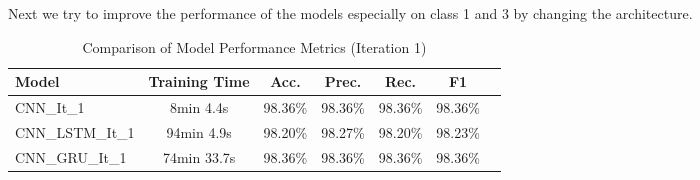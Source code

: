 Next we try to improve the performance of the models especially on class 1 and 3 by changing the architecture.

\begin{table}[bt]
    \centering
    \caption{Comparison of Model Performance Metrics (Iteration 1)}
    \label{tab:model_performance}
    \begin{tabular}{lcccccc}
        \toprule
        \textbf{Model} & \textbf{Training Time} & \textbf{Acc.} & \textbf{Prec.} & \textbf{Rec.} & \textbf{F1} \\
        \midrule
        CNN\_It\_1     & 8min 4.4s  & 98.36\% & 98.36\% & 98.36\% & 98.36\% \\
        CNN\_LSTM\_It\_1 & 94min 4.9s & 98.20\% & 98.27\% & 98.20\% & 98.23\% \\
        CNN\_GRU\_It\_1  & 74min 33.7s & 98.36\% & 98.36\% & 98.36\% & 98.36\% \\
        \bottomrule
    \end{tabular}
\end{table}

